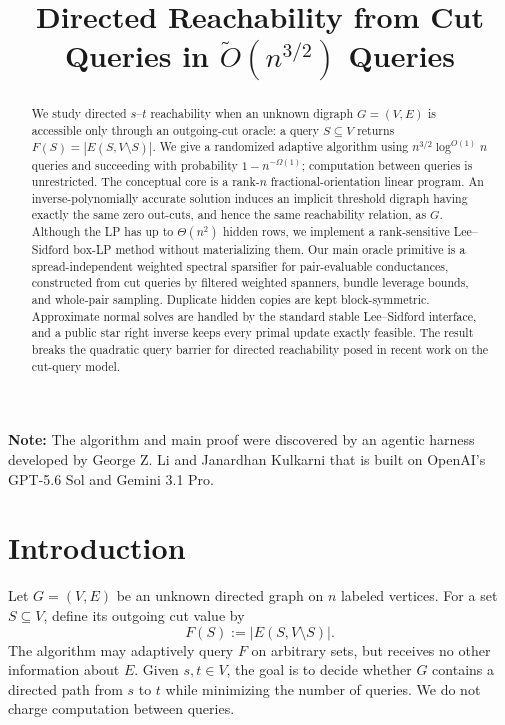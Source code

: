 \documentclass[11pt]{article}
\title{Directed Reachability from Cut Queries in
       $\widetilde O(n^{3/2})$ Queries}
\date{}
\theoremstyle{definition}
\newcommand{\defeq}{\mathrel{:=}}
\begin{document}
\maketitle

\begin{abstract}
We study directed $s$--$t$ reachability when an unknown digraph
$G=(V,E)$ is accessible only through an outgoing-cut oracle: a query
$S\subseteq V$ returns $F(S)=|E(S,V\setminus S)|$.  We give a randomized
adaptive algorithm using $n^{3/2}\log^{O(1)}n$ queries and succeeding with
probability $1-n^{-\Omega(1)}$; computation between queries is unrestricted.
The conceptual core is a rank-$n$ fractional-orientation linear program.  An
inverse-polynomially accurate solution induces an implicit threshold digraph
having exactly the same zero out-cuts, and hence the same reachability
relation, as $G$.  Although the LP has up to $\Theta(n^2)$ hidden rows, we
implement a rank-sensitive Lee--Sidford box-LP method without materializing
them.  Our main oracle primitive is a spread-independent weighted spectral
sparsifier for pair-evaluable conductances, constructed from cut queries by
filtered weighted spanners, bundle leverage bounds, and whole-pair sampling.
Duplicate hidden copies are kept block-symmetric.  Approximate normal solves
are handled by the standard stable Lee--Sidford interface, and a public star
right inverse keeps every primal update exactly feasible.  The result
breaks the quadratic query barrier for directed reachability posed in recent
work on the cut-query model.
\end{abstract}

\textbf{Note:} The algorithm and main proof were discovered by an agentic harness developed by George Z. Li and Janardhan Kulkarni that is built on OpenAI’s GPT-5.6 Sol and Gemini 3.1 Pro. 

\section{Introduction}

Let $G=(V,E)$ be an unknown directed graph on $n$ labeled vertices.  For a
set $S\subseteq V$, define its outgoing cut value by
\[
    F(S) \defeq |E(S,V\setminus S)|.
\]
The algorithm may adaptively query $F$ on arbitrary sets, but receives no
other information about $E$.  Given $s,t\in V$, the goal is to decide whether
$G$ contains a directed path from $s$ to $t$ while minimizing the number of
queries.  We do not charge computation between queries.
\end{document}
